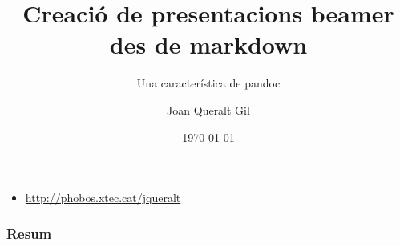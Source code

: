 \documentclass{beamer}
\title[De markdown a beamer]{Creació de presentacions beamer des de markdown}
\subtitle{Una característica de pandoc}
\author{Joan Queralt Gil}
\institute{cata\LaTeX{}}
\date{\today}
\begin{document}
\begin{frame}
\titlepage
\begin{itemize}
\item \url{http://phobos.xtec.cat/jqueralt}
\end{itemize}
\end{frame}

\begin{frame}
\frametitle{Resum}
\tableofcontents
\end{frame}


\end{document}
